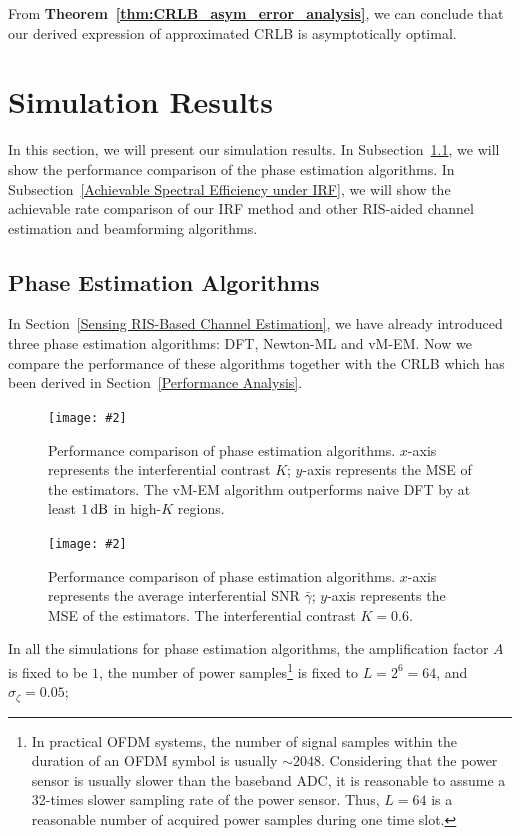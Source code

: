 \documentclass[journal,twocolumn]{IEEEtran}
\theoremstyle{nonumberplain}
\newcommand{\myincludegraphics}[2][width=1\linewidth]{\texttt{[image: \#2]}}
\newcommand{\myincludegraphics}[2][width=0.8\linewidth]{\texttt{[image: \#2]}}
\begin{document}
From {\bf Theorem~\ref{thm:CRLB_asym_error_analysis}}, we can conclude that our derived expression of approximated CRLB is asymptotically optimal.


\section{Simulation Results}
\label{Simulation Results}
In this section, we will present our simulation results. In Subsection~\ref{Phase Estimation Algorithms}, we will show the performance comparison of the phase estimation algorithms. In Subsection~\ref{Achievable Spectral Efficiency under IRF}, we will show the achievable rate comparison of our \ac{IRF} method and other RIS-aided channel estimation and beamforming algorithms. 

\subsection{Phase Estimation Algorithms} \label{Phase Estimation Algorithms}
    In Section~\ref{Sensing RIS-Based Channel Estimation}, we have already introduced three phase estimation algorithms: DFT, Newton-ML and vM-EM. Now we compare the performance of these algorithms together with the CRLB which has been derived in Section~\ref{Performance Analysis}. 
    \begin{figure}[!t]
        \centering
        \myincludegraphics{data/pe_K.pdf}
        \caption{Performance comparison of phase estimation algorithms. $x$-axis represents the interferential contrast $K$; $y$-axis represents the MSE of the estimators. The vM-EM algorithm outperforms naive DFT by at least $1\,{\rm dB}$ in high-$K$ regions. }
        \label{fig:phase estimation_K}
    \end{figure}
    \begin{figure}[!t]
        \centering
        \myincludegraphics{data/pe_gamma.pdf}
        \caption{Performance comparison of phase estimation algorithms. $x$-axis represents the average interferential SNR $\bar{\gamma}$; $y$-axis represents the MSE of the estimators. The interferential contrast $K=0.6$. }
        \label{fig:phase estimation_gamma}
    \end{figure}
    In all the simulations for phase estimation algorithms, the amplification factor $A$ is fixed to be $1$, the number of power samples\footnote{In practical OFDM systems, the number of signal samples within the duration of an OFDM symbol is usually $\sim 2048$. Considering that the power sensor is usually slower than the baseband ADC, it is reasonable to assume a 32-times slower sampling rate of the power sensor. Thus, $L=64$ is a reasonable number of acquired power samples during one time slot.} is fixed to $L=2^6=64$, and $\sigma_\zeta=0.05$; 
\end{document}
